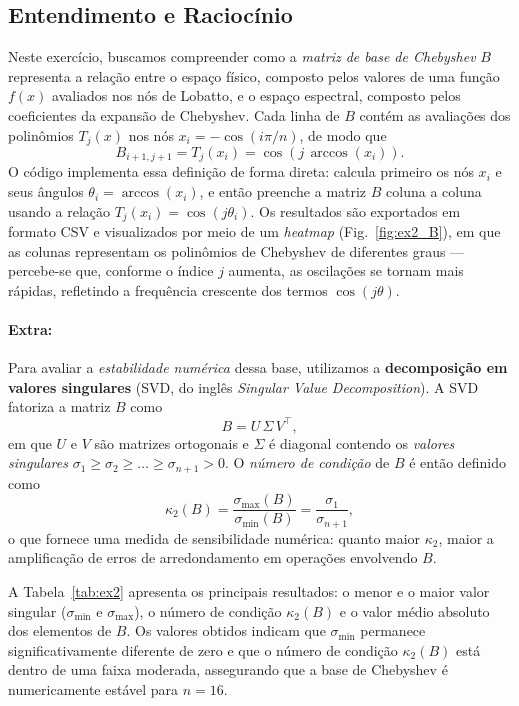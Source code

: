 \documentclass[11pt,a4paper]{article}
\begin{document}
\subsection*{Entendimento e Raciocínio}
Neste exercício, buscamos compreender como a \emph{matriz de base de Chebyshev} $B$ representa a relação entre o espaço físico, composto pelos valores de uma função $f(x)$ avaliados nos nós de Lobatto, e o espaço espectral, composto pelos coeficientes da expansão de Chebyshev. 
Cada linha de $B$ contém as avaliações dos polinômios $T_j(x)$ nos nós $x_i = -\cos(i\pi/n)$, de modo que
\[
B_{i+1,j+1} = T_j(x_i) = \cos(j\,\arccos(x_i)).
\]
O código implementa essa definição de forma direta: calcula primeiro os nós $x_i$ e seus ângulos $\theta_i = \arccos(x_i)$, e então preenche a matriz $B$ coluna a coluna usando a relação $T_j(x_i)=\cos(j\theta_i)$. 
Os resultados são exportados em formato CSV e visualizados por meio de um \emph{heatmap} (Fig.~\ref{fig:ex2_B}), em que as colunas representam os polinômios de Chebyshev de diferentes graus — percebe-se que, conforme o índice $j$ aumenta, as oscilações se tornam mais rápidas, refletindo a frequência crescente dos termos $\cos(j\theta)$.

\paragraph{Extra:} Para avaliar a \emph{estabilidade numérica} dessa base, utilizamos a \textbf{decomposição em valores singulares} (SVD, do inglês \emph{Singular Value Decomposition}). 
A SVD fatoriza a matriz $B$ como
\[
B = U\,\Sigma\,V^{\top},
\]
em que $U$ e $V$ são matrizes ortogonais e $\Sigma$ é diagonal contendo os \emph{valores singulares} $\sigma_1 \ge \sigma_2 \ge \dots \ge \sigma_{n+1} > 0$. 
O \emph{número de condição} de $B$ é então definido como
\[
\kappa_2(B) = \frac{\sigma_{\max}(B)}{\sigma_{\min}(B)} = \frac{\sigma_1}{\sigma_{n+1}},
\]
o que fornece uma medida de sensibilidade numérica: quanto maior $\kappa_2$, maior a amplificação de erros de arredondamento em operações envolvendo $B$.

A Tabela~\ref{tab:ex2} apresenta os principais resultados: o menor e o maior valor singular ($\sigma_{\min}$ e $\sigma_{\max}$), o número de condição $\kappa_2(B)$ e o valor médio absoluto dos elementos de $B$. 
Os valores obtidos indicam que $\sigma_{\min}$ permanece significativamente diferente de zero e que o número de condição $\kappa_2(B)$ está dentro de uma faixa moderada, assegurando que a base de Chebyshev é numericamente estável para $n=16$.
\end{document}
